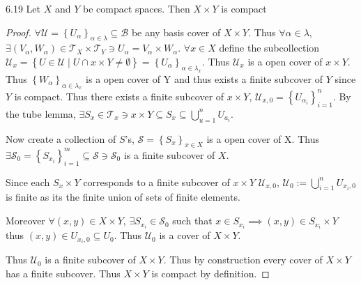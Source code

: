 \documentclass{article}
\newcommand*{\T}{\mathcal{T}}
\newcommand*{\B}{\mathcal{B}}
\newcommand*{\subeq}{\subseteq}
\begin{document}
\bigskip

\begin{claim}{6.19}\label{Claim 6.19.}
    Let $X$ and $Y$ be compact spaces. Then $X \times Y$ is compact   
\end{claim}
\begin{proof}
    $\forall \mathcal{U} = \left\{ U_{\alpha} \right\}_{\alpha \in \lambda} \subseteq \B$ be any basis cover of $X \times Y$. Thus $\forall \alpha \in \lambda$, $\exists (V_{\alpha}, W_{\alpha}) \in \T_{X} \times \T_Y \ni U_{\alpha} = V_{\alpha} \times W_{\alpha}$. $\forall x \in X$ define the subcollection $\mathcal{U}_{x} = \left\{ U \in \mathcal{U} \mid U \cap x \times Y \neq \emptyset \right\} = \left\{ U_{\alpha} \right\}_{\alpha \in \lambda_{x}}$. Thus $\mathcal{U}_x$ is a open cover of $x \times Y$. Thus $\left\{ W_{\alpha} \right\}_{\alpha \in \lambda_x}$ is a open cover of Y and thus exists a finite subcover of $Y$ since $Y$ is compact. Thus there exists a finite subcover of $x \times Y$, $\mathcal{U}_{x,0} = \left\{ U_{\alpha_i} \right\}_{i = 1}^n$. By the tube lemma, $\exists S_{x} \in \T_x \ni x\times Y \subeq S_{x}\subeq \bigcup_{u = 1}^n U_{a_i}$. 
    
    Now create a collection of $S$'s, $\mathcal{S} = \left\{ S_{x} \right\}_{x \in X}$ is a open cover of X. Thus $\exists \mathcal{S}_0 = \left\{ S_{x_i} \right\}_{i = 1}^m \subseteq \mathcal{S} \ni \mathcal{S}_0$ is a finite subcover of $X$. 
    
    Since each $S_x \times Y$ corresponds to a finite subcover of $x \times Y$ $\mathcal{U}_{x, 0}$, $\mathcal{U}_0 := \bigcup_{i = 1}^n U_{x_i, 0}$ is finite as its the finite union of sets of finite elements. 
    
    Moreover $\forall (x, y) \in X \times Y$, $\exists S_{x_i} \in \mathcal{S}_0$ such that $x \in S_{x_i} \implies (x, y) \in S_{x_i} \times Y$ thus $(x, y) \in U_{x_i, 0} \subseteq U_{0}$. Thus $\mathcal{U}_0$ is a cover of $X \times Y$. 
    
    Thus $\mathcal{U}_0$ is a finite subcover of $X \times Y$. Thus by construction every cover of $X \times Y$ has a finite subcover. Thus $X \times Y$ is compact by definition.   
\end{proof}

\bigskip
\end{document}
